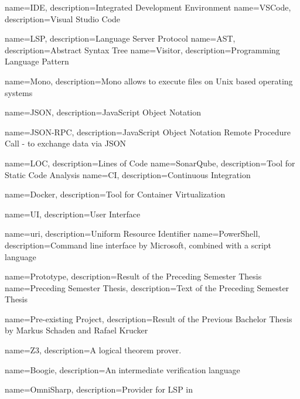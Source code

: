 {
	name=IDE,
	description={Integrated Development Environment}
}
{
	name=VSCode,
	description={Visual Studio Code}
}

{
	name=LSP,
	description={Language Server Protocol}
}
{
	name=AST,
	description={Abstract Syntax Tree}
}
{
	name=Visitor,
	description={Programming Language Pattern}
}

{
	name=Mono,
	description={Mono allows to execute  files on Unix based operating systems}
}

{
	name=JSON,
	description={JavaScript Object Notation}
}

{
	name=JSON-RPC,
	description={JavaScript Object Notation Remote Procedure Call - to exchange data via JSON}
}

{
	name=LOC,
	description={Lines of Code}
}
{
	name=SonarQube,
	description={Tool for Static Code Analysis}
}
{
	name=CI,
	description={Continuous Integration}
}

{
	name=Docker,
	description={Tool for Container Virtualization}
}

{
	name=UI,
	description={User Interface}
}

{
	name=uri,
	description={Uniform Resource Identifier}
}
{
	name=PowerShell,
	description={Command line interface by Microsoft, combined with a script language}
}

{
	name=Prototype,
	description={Result of the Preceding Semester Thesis}
}
{
	name=Preceding Semester Thesis,
	description={Text of the Preceding Semester Thesis}
}

{
	name=Pre-existing Project,
	description={Result of the Previous Bachelor Thesis by Markus Schaden and Rafael Krucker}
}

{
	name=Z3,
	description={A logical theorem prover.}
}

{
	name=Boogie,
	description={An intermediate verification language}
}

{
	name=OmniSharp,
	description={Provider for LSP in \Csharp}
}


